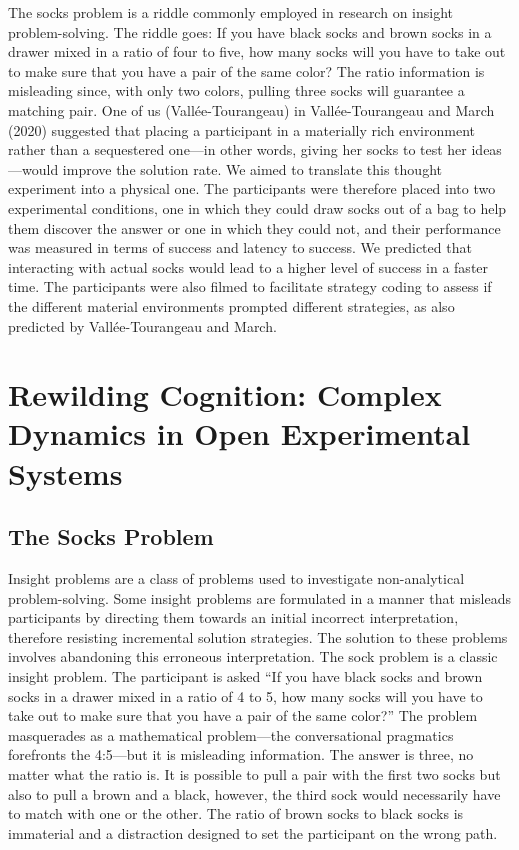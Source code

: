 \documentclass{article}
\begin{document}
The socks problem is a riddle commonly employed in research on insight problem-solving. The riddle goes: If you have black socks and brown socks in a drawer mixed in a ratio of four to five, how many socks will you have to take out to make sure that you have a pair of the same color? The ratio information is misleading since, with only two colors, pulling three socks will guarantee a matching pair. One of us (Vallée-Tourangeau) in Vallée-Tourangeau and March (2020) suggested that placing a participant in a materially rich environment rather than a sequestered one—in other words, giving her socks to test her ideas—would improve the solution rate. We aimed to translate this thought experiment into a physical one. The participants were therefore placed into two experimental conditions, one in which they could draw socks out of a bag to help them discover the answer or one in which they could not, and their performance was measured in terms of success and latency to success. We predicted that interacting with actual socks would lead to a higher level of success in a faster time. The participants were also filmed to facilitate strategy coding to assess if the different material environments prompted different strategies, as also predicted by Vallée-Tourangeau and March. 

\section{Rewilding Cognition: Complex Dynamics in Open Experimental Systems}

\subsection{The Socks Problem}

Insight problems are a class of problems used to investigate non-analytical problem-solving. Some insight problems are formulated in a manner that misleads participants by directing them towards an initial incorrect interpretation, therefore resisting incremental solution strategies. The solution to these problems involves abandoning this erroneous interpretation. The sock problem is a classic insight problem. The participant is asked “If you have black socks and brown socks in a drawer mixed in a ratio of 4 to 5, how many socks will you have to take out to make sure that you have a pair of the same color?” The problem masquerades as a mathematical problem—the conversational pragmatics forefronts the 4:5—but it is misleading information. The answer is three, no matter what the ratio is. It is possible to pull a pair with the first two socks but also to pull a brown and a black, however, the third sock would necessarily have to match with one or the other. The ratio of brown socks to black socks is immaterial and a distraction designed to set the participant on the wrong path. 
\end{document}
